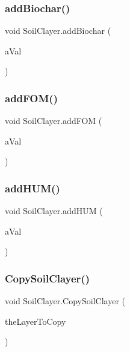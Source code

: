 \subsubsection{\texorpdfstring{addBiochar()}{addBiochar()}}
{\footnotesize\ttfamily void Soil\+Clayer.\+add\+Biochar (\begin{DoxyParamCaption}\item[{double}]{a\+Val }\end{DoxyParamCaption})\hspace{0.3cm}{\ttfamily [inline]}}

\mbox{\label{class_soil_clayer_a9d4734c2cc8736bb04b2f7d163900eac}} 
\subsubsection{\texorpdfstring{addFOM()}{addFOM()}}
{\footnotesize\ttfamily void Soil\+Clayer.\+add\+F\+OM (\begin{DoxyParamCaption}\item[{double}]{a\+Val }\end{DoxyParamCaption})\hspace{0.3cm}{\ttfamily [inline]}}

\mbox{\label{class_soil_clayer_a221ec3644b0aef328a8615c26f99bfca}} 
\subsubsection{\texorpdfstring{addHUM()}{addHUM()}}
{\footnotesize\ttfamily void Soil\+Clayer.\+add\+H\+UM (\begin{DoxyParamCaption}\item[{double}]{a\+Val }\end{DoxyParamCaption})\hspace{0.3cm}{\ttfamily [inline]}}

\mbox{\label{class_soil_clayer_a69593b3579da59ceffba75eb36925dbe}} 
\subsubsection{\texorpdfstring{CopySoilClayer()}{CopySoilClayer()}}
{\footnotesize\ttfamily void Soil\+Clayer.\+Copy\+Soil\+Clayer (\begin{DoxyParamCaption}\item[{\mbox{\hyperlink{class_soil_clayer}{Soil\+Clayer}}}]{the\+Layer\+To\+Copy }\end{DoxyParamCaption})\hspace{0.3cm}{\ttfamily [inline]}}

